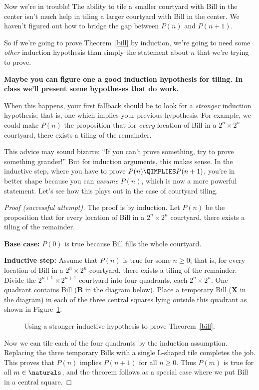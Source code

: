 Now we're in trouble!  The ability to tile a smaller courtyard with Bill
in the center isn't much help in tiling a larger courtyard with Bill in
the center.  We haven't figured out how to bridge the gap between $P(n)$
and $P(n+1)$.

So if we're going to prove Theorem~\ref{bill} by induction, we're going to
need some \emph{other} induction hypothesis than simply the statement
about $n$ that we're trying to prove.



\textbf{Maybe you can figure one a good induction hypothesis for
  tiling.  In class we'll present some hypotheses that do work.}


\iffalse  %

When this happens, your first fallback should be to look for a
\emph{stronger} induction hypothesis; that is, one which implies
your previous hypothesis.  For example, we could make $P(n)$ the
proposition that for \emph{every} location of Bill in a $2^n \times
2^n$ courtyard, there exists a tiling of the remainder.

This advice may sound bizarre: ``If you can't prove something, try to
prove something grander!''  But for induction arguments, this makes
sense.  In the inductive step, where you have to prove $P(n) \QIMPLIES
P(n+1)$, you're in better shape because you can \emph{assume} $P(n)$,
which is now a more powerful statement.  Let's see how this plays out
in the case of courtyard tiling.

\begin{proof}[Proof (successful attempt)]
The proof is by induction.  Let $P(n)$ be the proposition that for
every location of Bill in a $2^n \times 2^n$ courtyard, there exists a
tiling of the remainder.

\textbf{Base case:} $P(0)$ is true because Bill fills the
whole courtyard.

\textbf{Inductive step:} Assume that $P(n)$ is true for some
$n \geq 0$; that is, for every location of Bill in a $2^n \times 2^n$
courtyard, there exists a tiling of the remainder.  Divide the
$2^{n+1} \times 2^{n+1}$ courtyard into four quadrants, each $2^n
\times 2^n$.  One quadrant contains Bill (\textbf{B} in the diagram
below).  Place a temporary Bill (\textbf{X} in the diagram) in each of
the three central squares lying outside this quadrant as shown in
Figure~\ref{fig:stronger-bill}.

\begin{figure}


\caption{Using a stronger inductive hypothesis to prove
  Theorem~\ref{bill}.}
\label{fig:stronger-bill}
\end{figure}

Now we can tile each of the four quadrants by the induction
assumption.  Replacing the three temporary Bills with a single
L-shaped tile completes the job.  This proves that $P(n)$ implies
$P(n+1)$ for all $n \geq 0$.  Thus $P(m)$ is true for all $m \in
\naturals$, and the theorem follows as a special case where we put
Bill in a central square.
\end{proof}

